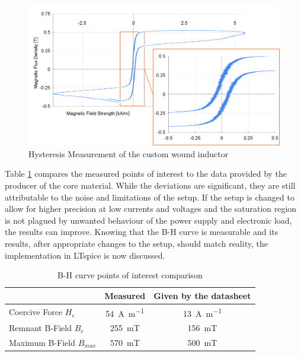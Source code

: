 \begin{figure}[H]
    \centering
    \includegraphics[width=1\linewidth]{Bilder//Kapitel3/Hysteresis_Measurement_3.png}
    \caption{Hysteresis Measurement of the custom wound inductor}
    \label{fig:hysteresis_measurement_of_the_custom_wound_inductor}
\end{figure}
Table \ref{tab:B-H_curve_points_of_interest_comparison} compares the measured points of interest to the data provided by the producer of the core material. While the deviations are significant, they are still attributable to the noise and limitations of the setup. If the setup is changed to allow for higher precision at low currents and voltages and the saturation region is not plagued by unwanted behaviour of the power supply and electronic load, the results can improve. Knowing that the B-H curve is measurable and its results, after appropriate changes to the setup, should match reality, the implementation in LTspice is now discussed.
\begin{table}[H]
    \centering
    \caption{B-H curve points of interest comparison}
    \begin{tabular}{|l|c|c|}
        \hline
        & Measured & Given by the datasheet \\
        \hline
        Coercive Force $H_c$ & \SI{54}{\A\per\m} & \SI{13}{\A\per\m}\\ 
        \hline
        Remnant B-Field $B_r$ & \SI{255}{\milli\tesla} & \SI{156}{\milli\tesla}\\
        \hline
        Maximum B-Field $B_{max}$ & \SI{570}{\milli\tesla} & \SI{500}{\milli\tesla}\\
        \hline
    \end{tabular}
    \label{tab:B-H_curve_points_of_interest_comparison}
\end{table}
